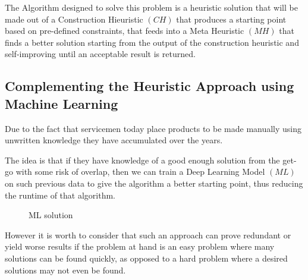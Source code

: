 \documentclass[12pt,a4paper]{report}
\begin{document}
The Algorithm designed to solve this problem is a heuristic solution that will be made out of a Construction Hieuristic $(C\!H)$ that produces a starting point based on pre-defined constraints, that feeds into a Meta Heuristic $(M\!H)$ that finds a better solution starting from the output of the construction heuristic and self-improving until an acceptable result is returned. 

\subsection{Complementing the Heuristic Approach using Machine Learning}
Due to the fact that servicemen today place products to be made manually using unwritten knowledge they have accumulated over the years.

The idea is that if they have knowledge of a good enough solution from the get-go with some risk of overlap, then we can train a Deep Learning Model $(M\!L)$ on such previous data to give the algorithm a better starting point, thus reducing the runtime of that algorithm.

\begin{figure}[ht]
    \centering
    \caption{ML solution}
    \label{fig:ml_solution}
\end{figure}

However it is worth to consider that such an approach can prove redundant or yield worse results if the problem at hand is an easy problem where many solutions can be found quickly, as opposed to a hard problem where a desired solutions may not even be found. 
\end{document}
